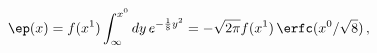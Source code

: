 \begin{equation}
 \ep(x)=f(x^1) \int_\infty^{x^0}dy\,e^{-\frac{1}{8}y^2}
  = -\sqrt{2\pi} f(x^1)\, \erfc (x^0/\sqrt{8})\,,\label{eq:ep}
\end{equation}

